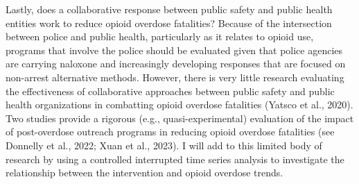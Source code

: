 Lastly, does a collaborative response between public safety and public health entities work to reduce opioid overdose fatalities? Because of the intersection between police and public health, particularly as it relates to opioid use, programs that involve the police should be evaluated given that police agencies are carrying naloxone and increasingly developing responses that are focused on non-arrest alternative methods. However, there is very little research evaluating the effectiveness of collaborative approaches between public safety and public health organizations in combatting opioid overdose fatalities (Yatsco et al., 2020). Two studies provide a rigorous (e.g., quasi-experimental) evaluation of the impact of post-overdose outreach programs in reducing opioid overdose fatalities (see Donnelly et al., 2022; Xuan et al., 2023). I will add to this limited body of research by using a controlled interrupted time series analysis to investigate the relationship between the intervention and opioid overdose trends.
